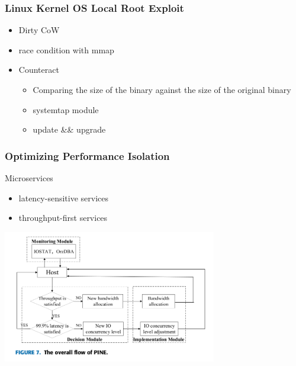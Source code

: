 \documentclass{beamer}
\begin{document}
\begin{frame}
    \frametitle{Linux Kernel OS Local Root Exploit}
    \begin{itemize}
        \item Dirty CoW
        \item race condition with mmap
        \item Counteract
              \begin{itemize}
                  \item Comparing the size of the binary against the size of the original binary\cite{root_exploit}
                  \item systemtap module
                  \item update \&\& upgrade
              \end{itemize}
    \end{itemize}
\end{frame}

\begin{frame}
    \frametitle{Optimizing Performance Isolation}
    \begin{beamerboxesrounded}{Microservices}
        \begin{itemize}
            \item latency-sensitive services
            \item throughput-first services
        \end{itemize}
        \centering\includegraphics[width=0.7\textwidth]{PINE.png}\cite{Optimizing}
    \end{beamerboxesrounded}
\end{frame}
\end{document}
